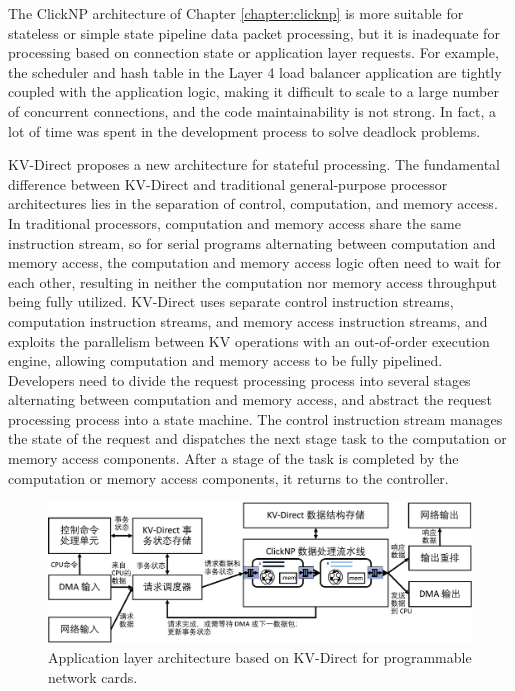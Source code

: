 The ClickNP architecture of Chapter \ref{chapter:clicknp} is more suitable for stateless or simple state pipeline data packet processing, but it is inadequate for processing based on connection state or application layer requests. For example, the scheduler and hash table in the Layer 4 load balancer application are tightly coupled with the application logic, making it difficult to scale to a large number of concurrent connections, and the code maintainability is not strong. In fact, a lot of time was spent in the development process to solve deadlock problems.

KV-Direct proposes a new architecture for stateful processing. The fundamental difference between KV-Direct and traditional general-purpose processor architectures lies in the separation of control, computation, and memory access. In traditional processors, computation and memory access share the same instruction stream, so for serial programs alternating between computation and memory access, the computation and memory access logic often need to wait for each other, resulting in neither the computation nor memory access throughput being fully utilized. KV-Direct uses separate control instruction streams, computation instruction streams, and memory access instruction streams, and exploits the parallelism between KV operations with an out-of-order execution engine, allowing computation and memory access to be fully pipelined. Developers need to divide the request processing process into several stages alternating between computation and memory access, and abstract the request processing process into a state machine. The control instruction stream manages the state of the request and dispatches the next stage task to the computation or memory access components. After a stage of the task is completed by the computation or memory access components, it returns to the controller.

\begin{figure}[htbp]
	\centering
	\includegraphics[width=1.0\textwidth]{../figures/kvdirect_arch.pdf}
	\caption{Application layer architecture based on KV-Direct for programmable network cards.}
	\label{arch:fig:kvdirect_arch_application}
\end{figure}

